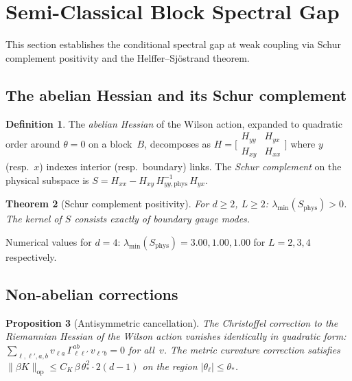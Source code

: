 \documentclass[11pt]{article}
\newtheorem{theorem}{Theorem}[section]
\newtheorem{proposition}[theorem]{Proposition}
\theoremstyle{definition}
\newtheorem{definition}[theorem]{Definition}
\begin{document}



\section{Semi-Classical Block Spectral Gap}\label{syn-sec:semiclassical}

This section establishes the conditional spectral gap
at weak coupling via Schur complement positivity and the
Helffer--Sj\"ostrand theorem.

\subsection{The abelian Hessian and its Schur complement}

\begin{definition}
The \emph{abelian Hessian} of the Wilson action, expanded
to quadratic order around $\theta = 0$ on a block~$B$,
decomposes as
$H = \bigl[\begin{smallmatrix}
H_{yy} & H_{yx} \\ H_{xy} & H_{xx}
\end{smallmatrix}\bigr]$
where $y$ (resp.\ $x$) indexes interior (resp.\ boundary) links.
The \emph{Schur complement} on the physical subspace is
$S = H_{xx} - H_{xy}\,H_{yy,\mathrm{phys}}^{-1}\,H_{yx}$.
\end{definition}

\begin{theorem}[Schur complement positivity]
\label{syn-thm:schur}
For $d \geq 2$, $L \geq 2$:
$\lambda_{\min}(S_{\mathrm{phys}}) > 0$.
The kernel of $S$ consists exactly of boundary gauge modes.
\end{theorem}

\noindent Numerical values for $d = 4$:
$\lambda_{\min}(S_{\mathrm{phys}}) = 3.00, 1.00, 1.00$
for $L = 2, 3, 4$ respectively.

\subsection{Non-abelian corrections}

\begin{proposition}[Antisymmetric cancellation]
\label{syn-prop:antisym}
The Christoffel correction to the Riemannian Hessian of
the Wilson action vanishes identically in quadratic form:
$\sum_{\ell,\ell',a,b} v_{\ell a}\,\Gamma_{\ell\ell'}^{ab}
\,v_{\ell' b} = 0$ for all~$v$.
The metric curvature correction satisfies
$\|\beta K\|_{\mathrm{op}} \leq C_K\,\beta\,\theta_*^2
\cdot 2(d{-}1)$ on the region $|\theta_\ell| \leq \theta_*$.
\end{proposition}
\end{document}
